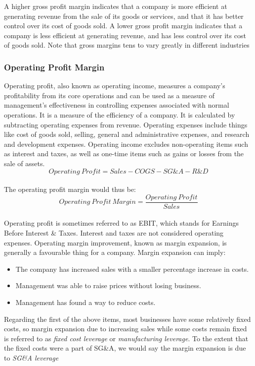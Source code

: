 \documentclass{article}
\begin{document}
A higher gross profit margin indicates that a company is more efficient at generating revenue from the sale of its goods or services, and that it has better control over its cost of goods sold. A lower gross profit margin indicates that a company is less efficient at generating revenue, and has less control over its cost of goods sold. Note that gross margins tens to vary greatly in different industries

\subsubsection{Operating Profit Margin}
Operating profit, also known as operating income, measures a company's profitability from its core operations and can be used as a measure of management's effectiveness in controlling expenses associated with normal operations. It is a measure of the efficiency of a company. It is calculated by subtracting operating expenses from revenue. Operating expenses include things like cost of goods sold, selling, general and administrative expenses, and research and development expenses. Operating income excludes non-operating items such as interest and taxes, as well as one-time items such as gains or losses from the sale of assets.
\begin{equation}
    Operating\: Profit = Sales - COGS - SG\&A - R\&D
\end{equation}\\

The operating profit margin would thus be:
\begin{equation}
    Operating\:Profit\:Margin = \frac{Operating\:Profit}{Sales}
\end{equation}\\

Operating profit is sometimes referred to as EBIT, which stands for Earnings Before Interest \& Taxes. Interest and taxes are not considered operating expenses. Operating margin improvement, known as margin expansion, is generally a favourable thing for a company. Margin expansion can imply:
\begin{itemize}
\item The company has increased sales with a smaller percentage increase in costs.
\item Management was able to raise prices without losing business.
\item Management has found a way to reduce costs.
\end{itemize}

Regarding the first of the above items, most businesses have some relatively fixed costs, so margin expansion due to increasing sales while some costs remain fixed is referred to as \textit{fixed cost leverage} or \textit{manufacturing leverage}. To the extent that the fixed costs were a part of SG\&A, we would say the margin expansion is due to \textit{SG\&A leverage}
\end{document}
